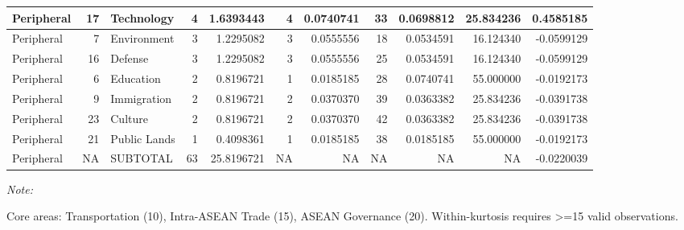 \begin{table}[!h]
{\begin{threeparttable}
\begin{tabular}[t]{lrlrrrrrrrr}
\midrule
\hspace{1em}Peripheral & 17 & Technology & 4 & 1.6393443 & 4 & 0.0740741 & 33 & 0.0698812 & 25.834236 & 0.4585185\\
\midrule
\hspace{1em}Peripheral & 7 & Environment & 3 & 1.2295082 & 3 & 0.0555556 & 18 & 0.0534591 & 16.124340 & -0.0599129\\
\midrule
\hspace{1em}Peripheral & 16 & Defense & 3 & 1.2295082 & 3 & 0.0555556 & 25 & 0.0534591 & 16.124340 & -0.0599129\\
\midrule
\hspace{1em}Peripheral & 6 & Education & 2 & 0.8196721 & 1 & 0.0185185 & 28 & 0.0740741 & 55.000000 & -0.0192173\\
\midrule
\hspace{1em}Peripheral & 9 & Immigration & 2 & 0.8196721 & 2 & 0.0370370 & 39 & 0.0363382 & 25.834236 & -0.0391738\\
\midrule
\hspace{1em}Peripheral & 23 & Culture & 2 & 0.8196721 & 2 & 0.0370370 & 42 & 0.0363382 & 25.834236 & -0.0391738\\
\midrule
\hspace{1em}Peripheral & 21 & Public Lands & 1 & 0.4098361 & 1 & 0.0185185 & 38 & 0.0185185 & 55.000000 & -0.0192173\\
\midrule
\hspace{1em}Peripheral & NA & SUBTOTAL & 63 & 25.8196721 & NA & NA & NA & NA & NA & -0.0220039\\
\bottomrule
\end{tabular}
\begin{tablenotes}[para]
\item \textit{Note: } 
\item Core areas: Transportation (10), Intra-ASEAN Trade (15), ASEAN Governance (20). Within-kurtosis requires >=15 valid observations.
\end{tablenotes}
\end{threeparttable}}
\end{table}

